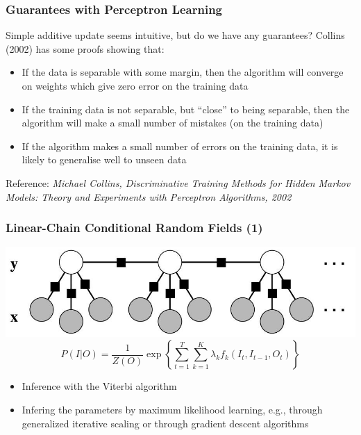 \documentclass{beamer}
\begin{document}
\begin{frame}
\frametitle{Guarantees with Perceptron Learning}
Simple additive update seems intuitive, but do we have any guarantees? Collins (2002) has some proofs showing that:
\begin{itemize}
\item If the data is separable with some margin, then the algorithm will converge on weights which give zero error on the training data
\item If the training data is not separable, but “close” to being separable, then the algorithm will make a small number of mistakes (on the training data)
\item If the algorithm makes a small number of errors on the training data, it is likely to generalise well to unseen data
\end{itemize}
Reference: {\it Michael Collins, Discriminative Training Methods for Hidden Markov Models: Theory and Experiments with Perceptron Algorithms, 2002}
\end{frame}

 \begin{frame}
     \frametitle{Linear-Chain Conditional Random Fields (1)}
     \centering
     \includegraphics[width=.9\linewidth]{crf}
     \begin{displaymath}
         P(I|O) = \frac{1}{Z(O)}\exp\left\{\sum_{t=1}^T \sum_{k=1}^K\lambda_kf_k(I_t, I_{t-1}, O_t)\right\}
     \end{displaymath}
     \begin{itemize}
     \item Inference with the Viterbi algorithm
     \item Infering the parameters by maximum likelihood learning, e.g., through generalized iterative scaling or through gradient descent algorithms
     \end{itemize}
\end{frame}

\end{document}
